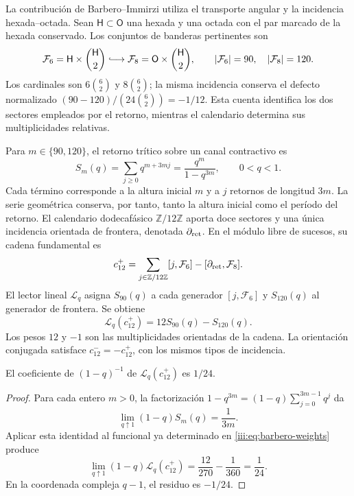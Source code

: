 La contribución de Barbero--Immirzi utiliza el transporte angular y la
incidencia hexada--octada. Sean $\mathsf H\subset\mathsf O$ una hexada
y una octada con el par marcado de la hexada conservado. Los conjuntos de
banderas pertinentes son
\begin{equation}
 \mathcal F_6=\mathsf H\times\binom{\mathsf H}{2}
 \lhook\joinrel\longrightarrow
 \mathcal F_8=\mathsf O\times\binom{\mathsf H}{2},
 \qquad |\mathcal F_6|=90,\quad |\mathcal F_8|=120.
 \label{iii:eq:barbero-flags}
\end{equation}
Los cardinales son $6\binom62$ y $8\binom62$; la misma incidencia
conserva el defecto normalizado
$(90-120)/(24\binom62)=-1/12$. Esta cuenta identifica los dos sectores
empleados por el retorno, mientras el calendario determina sus
multiplicidades relativas.

Para $m\in\{90,120\}$, el retorno trítico sobre un canal contractivo es
\begin{equation}
 S_m(q)=\sum_{j\geq0}q^{m+3mj}
       =\frac{q^m}{1-q^{3m}},\qquad 0<q<1.
 \label{iii:eq:barbero-return-series}
\end{equation}
Cada término corresponde a la altura inicial $m$ y a $j$ retornos de
longitud $3m$. La serie geométrica conserva, por tanto, tanto la altura
inicial como el período del retorno. El calendario dodecafásico
$\mathbb Z/12\mathbb Z$ aporta doce sectores y una única incidencia
orientada de frontera, denotada $\partial_{\rm ret}$. En el módulo
libre de sucesos, su cadena fundamental es
\begin{equation}
 c_{12}^{+}
 =\sum_{j\in\mathbb Z/12\mathbb Z}[j,\mathcal F_6]
  -[\partial_{\rm ret},\mathcal F_8].
 \label{iii:eq:barbero-cycle}
\end{equation}
El lector lineal $\mathscr L_q$ asigna $S_{90}(q)$ a cada generador
$[j,\mathcal F_6]$ y $S_{120}(q)$ al generador de frontera. Se obtiene
\begin{equation}
 \mathscr L_q(c_{12}^{+})=12S_{90}(q)-S_{120}(q).
 \label{iii:eq:barbero-weights}
\end{equation}
Los pesos $12$ y $-1$ son las multiplicidades orientadas de la cadena.
La orientación conjugada satisface $c_{12}^{-}=-c_{12}^{+}$, con los
mismos tipos de incidencia.

\begin{proposition}
\label{iii:prop:barbero-pole}
El coeficiente de $(1-q)^{-1}$ de
$\mathscr L_q(c_{12}^{+})$ es $1/24$.
\end{proposition}
\begin{proof}
Para cada entero $m>0$, la factorización
$1-q^{3m}=(1-q)\sum_{j=0}^{3m-1}q^j$ da
\[
 \lim_{q\uparrow1}(1-q)S_m(q)=\frac1{3m}.
\]
Aplicar esta identidad al funcional ya determinado en
\eqref{iii:eq:barbero-weights} produce
\begin{equation}
 \lim_{q\uparrow1}(1-q)\mathscr L_q(c_{12}^{+})
 =\frac{12}{270}-\frac1{360}=\frac1{24}.
 \label{iii:eq:barbero-pole}
\end{equation}
En la coordenada compleja $q-1$, el residuo es $-1/24$.
\end{proof}

